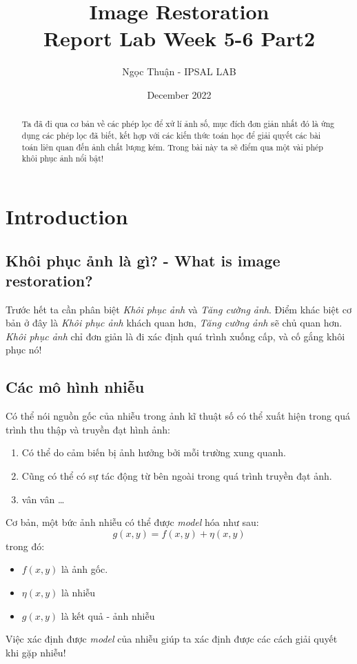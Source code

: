 \documentclass{article}
\title{Image Restoration\\ \Large Report Lab Week 5-6 Part2}
\author{Ngọc Thuận - IPSAL LAB}
\date{December 2022}
\begin{document}
\maketitle
\begin{abstract}
    Ta đã đi qua cơ bản về các phép lọc để xử lí ảnh số, mục đích đơn giản nhất đó là ứng dụng các phép lọc đã biết, kết hợp với các kiến thức toán học để giải quyết các bài toán liên quan đến ảnh chất lượng kém. Trong bài này ta sẽ điểm qua một vài phép khôi phục ảnh nổi bật!
\end{abstract}

\section{Introduction}
    \subsection{Khôi phục ảnh là gì? - What is image restoration?}
    Trước hết ta cần phân biệt \textit{Khôi phục ảnh} và \textit{Tăng cường ảnh}. Điểm khác biệt cơ bản ở đây là \textit{Khôi phục ảnh} khách quan hơn, \textit{Tăng cường ảnh} sẽ chủ quan hơn.\\
    \textit{Khôi phục ảnh} chỉ đơn giản là đi xác định quá trình xuống cấp, và cố gắng khôi phục nó!
    \subsection{Các mô hình nhiễu}
    Có thể nói nguồn gốc của nhiễu trong ảnh kĩ thuật số có thể xuất hiện trong quá trình thu thập và truyền đạt hình ảnh:
    \begin{enumerate}
        \item Có thể do cảm biến bị ảnh hưởng bởi mỗi trường xung quanh.
        \item Cũng có thể có sự tác động từ bên ngoài trong quá trình truyền đạt ảnh.
        \item vân vân \ldots
    \end{enumerate}
    Cơ bản, một bức ảnh nhiễu có thể được \textit{model} hóa như sau:
    $$g(x,y) = f(x,y) + \eta (x,y)$$
    trong đó:
    \begin{itemize}
        \item $f(x,y)$ là ảnh gốc.
        \item $\eta (x,y)$ là nhiễu
        \item $g(x,y)$ là kết quả - ảnh nhiễu
    \end{itemize}
    Việc xác định được \textit{model} của nhiễu giúp ta xác định được các cách giải quyết khi gặp nhiễu!\\
\end{document}
